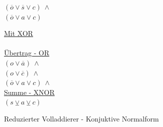 \begin{figure}[!h]
\begin{minipage}[l]{3.5cm}
    $ (\overline{o} \vee \overline{s} \vee c) ~ \wedge $\\
    $ (\overline{o} \vee a \vee c) $
  \end{minipage}
  \begin{minipage}[l]{3.5cm}
    \underline{Mit XOR}\\
    ~\\
    \underline{Übertrag - OR}\\
    $ (o \vee \overline{a}) ~ \wedge $\\
    $ (o \vee \overline{c}) ~ \wedge $\\
    $ (\overline{o} \vee a \vee c) ~ \wedge $\\
    \underline{Summe - XNOR}\\
    $ (s \veebar a \veebar c) $
  \end{minipage}
  \caption{Reduzierter Volladdierer - Konjuktive Normalform}
  \label{fig:red_fulladder_cnf}
\end{figure}

